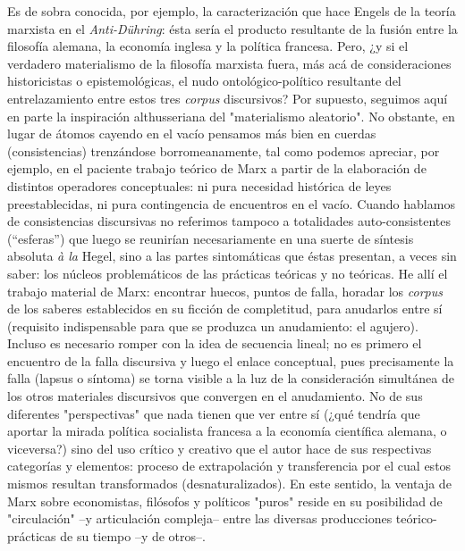 \documentclass{book}
\begin{document}
Es de sobra conocida, por ejemplo, la caracterización que hace Engels de
la teoría marxista en el \emph{Anti-Dühring}: ésta sería el producto
resultante de la fusión entre la filosofía alemana, la economía inglesa
y la política francesa. Pero, ¿y si el verdadero materialismo de la
filosofía marxista fuera, más acá de consideraciones historicistas o
epistemológicas, el nudo ontológico-político resultante del
entrelazamiento entre estos tres \emph{corpus} discursivos? Por
supuesto, seguimos aquí en parte la inspiración althusseriana del
"materialismo aleatorio". No obstante, en lugar de átomos cayendo en el
vacío pensamos más bien en cuerdas (consistencias) trenzándose
borromeanamente, tal como podemos apreciar, por ejemplo, en el paciente
trabajo teórico de Marx a partir de la elaboración de distintos
operadores conceptuales: ni pura necesidad histórica de leyes
preestablecidas, ni pura contingencia de encuentros en el vacío. Cuando
hablamos de consistencias discursivas no referimos tampoco a totalidades
auto-consistentes (``esferas'') que luego se reunirían necesariamente en
una suerte de síntesis absoluta \emph{à la} Hegel, sino a las partes
sintomáticas que éstas presentan, a veces sin saber: los núcleos
problemáticos de las prácticas teóricas y no teóricas. He allí el
trabajo material de Marx: encontrar huecos, puntos de falla, horadar los
\emph{corpus} de los saberes establecidos en su ficción de completitud,
para anudarlos entre sí (requisito indispensable para que se produzca un
anudamiento: el agujero). Incluso es necesario romper con la idea de
secuencia lineal; no es primero el encuentro de la falla discursiva y
luego el enlace conceptual, pues precisamente la falla (lapsus o
síntoma) se torna visible a la luz de la consideración simultánea de los
otros materiales discursivos que convergen en el anudamiento. No de sus
diferentes "perspectivas" que nada tienen que ver entre sí (¿qué tendría
que aportar la mirada política socialista francesa a la economía
científica alemana, o viceversa?) sino del uso crítico y creativo que el
autor hace de sus respectivas categorías y elementos: proceso de
extrapolación y transferencia por el cual estos mismos resultan
transformados (desnaturalizados). En este sentido, la ventaja de Marx
sobre economistas, filósofos y políticos "puros" reside en su
posibilidad de "circulación" --y articulación compleja-- entre las
diversas producciones teórico-prácticas de su tiempo --y de otros--.
\end{document}
